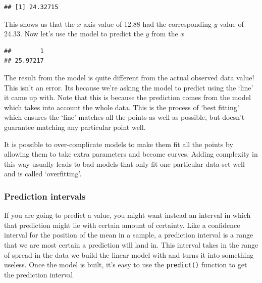 \documentclass[
]{book}
\newenvironment{Shaded}{\begin{snugshade}}{\end{snugshade}}
\newcommand{\DataTypeTok}[1]{\textcolor[rgb]{0.13,0.29,0.53}{#1}}
\newcommand{\DecValTok}[1]{\textcolor[rgb]{0.00,0.00,0.81}{#1}}
\newcommand{\KeywordTok}[1]{\textcolor[rgb]{0.13,0.29,0.53}{\textbf{#1}}}
\newcommand{\NormalTok}[1]{#1}
\newcommand{\OperatorTok}[1]{\textcolor[rgb]{0.81,0.36,0.00}{\textbf{#1}}}
\newcommand{\StringTok}[1]{\textcolor[rgb]{0.31,0.60,0.02}{#1}}
\newenvironment{sidenote}
{ \begin{tcolorbox}[colbacktitle=blue!50!white,
title=huh?,coltitle=white,
fonttitle=\bfseries] }
{  \end{tcolorbox} }
\begin{document}
\begin{verbatim}
## [1] 24.32715
\end{verbatim}

This shows us that the \(x\) axis value of 12.88 had the corresponding \(y\) value of 24.33. Now let's use the model to predict the \(y\) from the \(x\)

\begin{Shaded}
\end{Shaded}

\begin{verbatim}
##        1 
## 25.97217
\end{verbatim}

The result from the model is quite different from the actual observed data value! This isn't an error. Its because we're asking the model to predict using the `line' it came up with. Note that this is because the prediction comes from the model which takes into account the whole data. This is the process of `best fitting' which ensures the `line' matches all the points as well as possible, but doesn't guarantee matching any particular point well.

\begin{sidenote}
It is possible to over-complicate models to make them fit all the points by allowing them to take extra parameters and become curves. Adding complexity in this way usually leads to bad models that only fit one particular data set well and is called `overfitting'.
\end{sidenote}

\hypertarget{prediction-intervals}{%
\subsubsection{Prediction intervals}\label{prediction-intervals}}

If you are going to predict a value, you might want instead an interval in which that prediction might lie with certain amount of certainty. Like a confidence interval for the position of the mean in a sample, a prediction interval is a range that we are most certain a prediction will land in. This interval takes in the range of spread in the data we build the linear model with and turns it into something useless. Once the model is built, it's easy to use the \texttt{predict()} function to get the prediction interval
\end{document}
